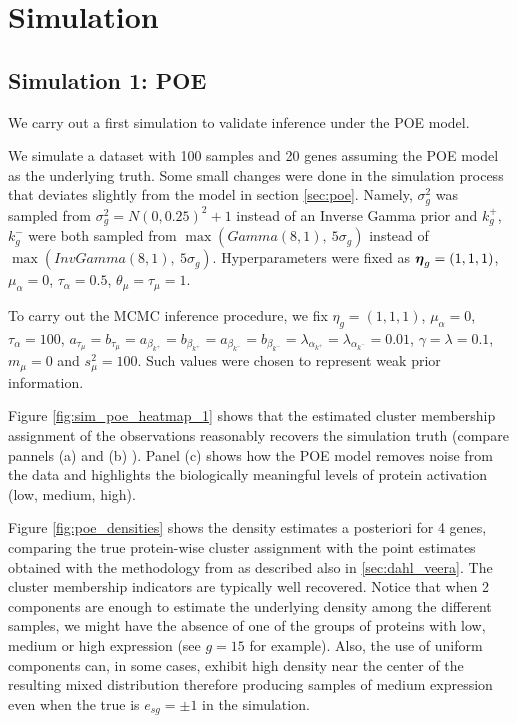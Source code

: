 \section{Simulation}

\subsection{Simulation 1: POE}

We carry out a first simulation to validate inference under the POE model.

We simulate a dataset with 100 samples and 20 genes assuming the POE model as the underlying truth. Some small changes were done in the simulation process that deviates slightly from the model in section \ref{sec:poe}. Namely, $\sigma^2_g$ was sampled from $\sigma^2_g = N(0, 0.25)^2 + 1$ instead of an Inverse Gamma prior and $k^+_g$, $k^-_g$ were both sampled from $\max( Gamma(8, 1), \  5\sigma_g)$ instead of $\max( InvGamma(8, 1), \  5\sigma_g)$. Hyperparameters were fixed as $\mbox{\boldmath $\eta$}_g=(1, 1, 1)$, $\mu_{\alpha}=0$, $\tau_{\alpha} = 0.5$, $\theta_{\mu}=\tau_{\mu} = 1$.

To carry out the MCMC inference procedure, we fix $\eta_g = (1, 1, 1)$, $\mu_{\alpha}=0$, $\tau_{\alpha}=100$, $a_{\tau_{\mu}} = b_{\tau_{\mu}} = a_{\beta_{k^+}} = b_{\beta_{k^+}} = a_{\beta_{k^-}} = b_{\beta_{k^-}} = \lambda_{\alpha_{k^+}} = \lambda_{\alpha_{k^-}} = 0.01$, $\gamma = \lambda = 0.1$, $m_{\mu}=0$ and $s^2_{\mu}=100$. Such values were chosen to represent weak prior information. 

Figure \ref{fig:sim_poe_heatmap_1} shows that the estimated cluster membership assignment of the observations reasonably recovers the simulation truth (compare pannels (a) and (b) ). Panel (c) shows how the POE model removes noise from the data and highlights the biologically meaningful levels of protein activation (low, medium, high).

Figure \ref{fig:poe_densities} shows the density estimates a posteriori for 4 genes, comparing the true protein-wise cluster assignment with the point estimates obtained with the methodology from \cite{dahl2006} as described also in \ref{sec:dahl_veera}. The cluster membership indicators are typically well recovered. Notice that when 2 components are enough to estimate the underlying density among the different samples, we might have the absence of one of the groups of proteins with low, medium or high expression (see $g=15$ for example). Also, the use of uniform components can, in some cases, exhibit high density near the center  of the resulting mixed distribution therefore producing samples of medium expression even when the true is $e_{sg} = \pm 1$ in the simulation.

